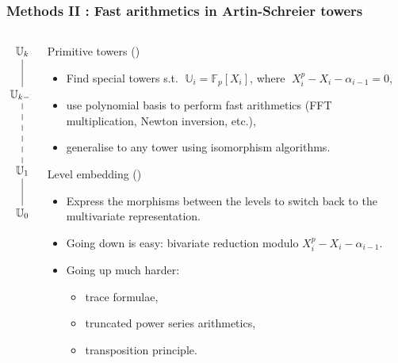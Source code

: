 \documentclass[10pt]{beamer}
\newcommand{\U}{\mathbb{U}}  %
\newcommand{\F}{\mathbb{F}}  %
\newcommand{\0}{\mathcal{O}}  %
\begin{document}
\begin{frame}
  \frametitle{Methods II : Fast arithmetics in Artin-Schreier towers}

  \begin{columns}
    \begin{column}{0.1\textwidth}
      \Large\[\xymatrix{
        \U_k\ar@{-}[d]\\
        \U_{k-1} \ar@{--}[dd]\\
        \\
        \U_1 \ar@{-}[d]\\
        \U_0
      }\]
    \end{column}
    \begin{column}{0.85\textwidth}
      \begin{block}{Primitive towers (\cite{DFS09})}
        \begin{itemize}
        \item Find special towers s.t. $\;\U_i = \F_p[X_i]$, where
          $\;X_i^p-X_i-\alpha_{i-1}=0$,
        \item use polynomial basis to perform fast arithmetics (FFT
          multiplication, Newton inversion, etc.),
        \item generalise to any tower using isomorphism algorithms.
        \end{itemize}
      \end{block}
      
      \begin{block}{Level embedding (\cite{DFS09})}
        \begin{itemize}
        \item Express the morphisms between the levels to switch back
          to the multivariate representation.
        \item Going down is easy: bivariate reduction modulo
          $X_i^p-X_i-\alpha_{i-1}$.
        \item Going up much harder:
          \begin{itemize}
          \item trace formulae,
          \item truncated power series arithmetics,
          \item transposition principle.
          \end{itemize}
        \end{itemize}
      \end{block}
    \end{column}
  \end{columns}
\end{frame}
\end{document}
